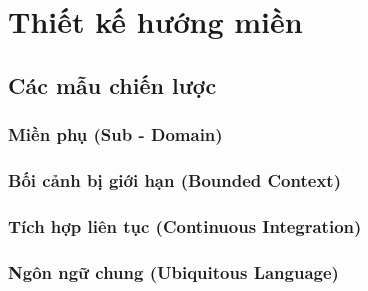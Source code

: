 \chapter{Thiết kế hướng miền}
% 
\section{Các mẫu chiến lược}

\subsection{Miền phụ (Sub - Domain)}
% 
\subsection{Bối cảnh bị giới hạn (Bounded Context)}
%  
\subsection{ Tích hợp liên tục  (Continuous Integration)}
% 
\subsection{Ngôn ngữ chung (Ubiquitous Language)}
% 
